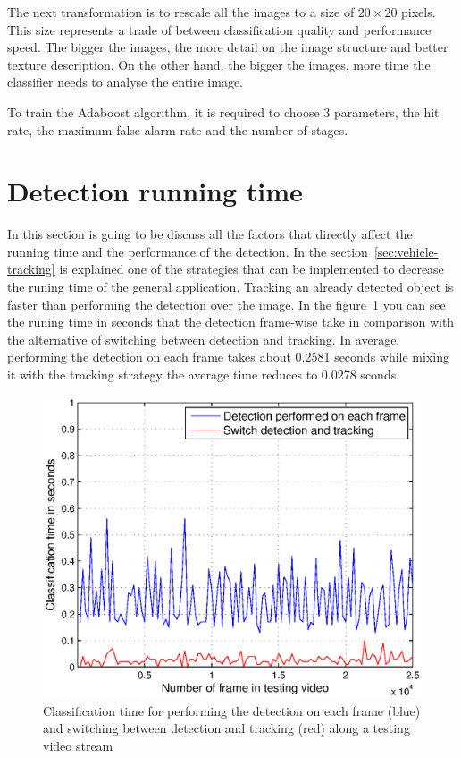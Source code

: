 The next transformation is to rescale all the images to a size of $20\times20$
pixels. This size represents a trade
of between classification quality and performance speed. The bigger the images,
the more detail on the image structure and better texture description. On the
other hand, the bigger the images, more time the classifier needs to analyse the
entire image.

To train the Adaboost algorithm, it is required to choose 3 parameters, the hit
rate, the maximum false alarm rate and the number of stages. 


\section{Detection running time} %
\label{sec:running-time}

In this section is going to be discuss all the factors that directly affect the
running time and the performance of the detection. In the
section~\ref{sec:vehicle-tracking} is explained one of the strategies that can
be implemented to decrease the runing time of the general application. Tracking
an already detected object is faster than performing the detection over the
image. In the figure~\ref{fig:trackingvsdetection} you can see the runing time
in seconds that the detection frame-wise take in comparison with the alternative
of switching between detection and tracking. In average, performing the
detection on each frame takes about 0.2581 seconds while mixing it with the
tracking strategy the average time reduces to 0.0278 sconds.


\begin{figure}[h]
\centering
\includegraphics[width=\linewidth]{img/trackingvsdetection.eps}
\caption{Classification time for performing the detection on each
    frame (blue) and switching between detection and tracking (red) along a
    testing video stream}
\label{fig:trackingvsdetection}
\end{figure} 

